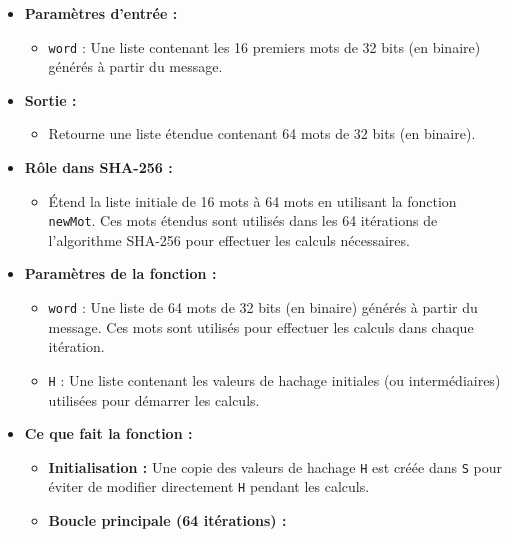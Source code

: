 \documentclass[11pt]{article}
\providecommand{\tightlist}{%
      \setlength{\itemsep}{0pt}\setlength{\parskip}{0pt}}
\begin{document}
\begin{itemize}
\tightlist
\item
  \textbf{Paramètres d'entrée :}

  \begin{itemize}
  \tightlist
  \item
    \texttt{word} : Une liste contenant les 16 premiers mots de 32 bits
    (en binaire) générés à partir du message.
  \end{itemize}
\item
  \textbf{Sortie :}

  \begin{itemize}
  \tightlist
  \item
    Retourne une liste étendue contenant 64 mots de 32 bits (en
    binaire).
  \end{itemize}
\item
  \textbf{Rôle dans SHA-256 :}

  \begin{itemize}
  \tightlist
  \item
    Étend la liste initiale de 16 mots à 64 mots en utilisant la
    fonction \texttt{newMot}. Ces mots étendus sont utilisés dans les 64
    itérations de l'algorithme SHA-256 pour effectuer les calculs
    nécessaires.
  \end{itemize}
\item
  \textbf{Paramètres de la fonction :}

  \begin{itemize}
  \tightlist
  \item
    \texttt{word} : Une liste de 64 mots de 32 bits (en binaire) générés
    à partir du message. Ces mots sont utilisés pour effectuer les
    calculs dans chaque itération.
  \item
    \texttt{H} : Une liste contenant les valeurs de hachage initiales
    (ou intermédiaires) utilisées pour démarrer les calculs.
  \end{itemize}
\item
  \textbf{Ce que fait la fonction :}

  \begin{itemize}
  \tightlist
  \item
    \textbf{Initialisation :} Une copie des valeurs de hachage
    \texttt{H} est créée dans \texttt{S} pour éviter de modifier
    directement \texttt{H} pendant les calculs.
  \item
    \textbf{Boucle principale (64 itérations) :}


\end{itemize}
\end{itemize}
\end{document}
